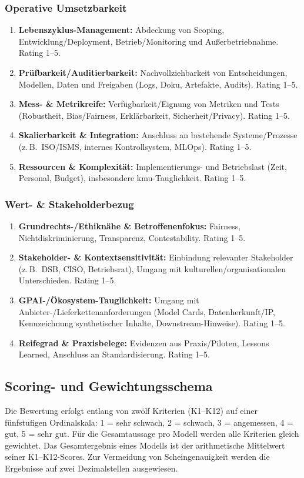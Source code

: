 \subsubsection{Operative Umsetzbarkeit}
\begin{enumerate}
  \item[K4] \textbf{Lebenszyklus-Management:} Abdeckung von Scoping, Entwicklung/Deployment, Betrieb/Monitoring und Außerbetriebnahme. Rating 1–5.
  \item[K5] \textbf{Prüfbarkeit/Auditierbarkeit:} Nachvollziehbarkeit von Entscheidungen, Modellen, Daten und Freigaben (Logs, Doku, Artefakte, Audits). Rating 1–5.
  \item[K6] \textbf{Mess- \& Metrikreife:} Verfügbarkeit/Eignung von Metriken und Tests (Robustheit, Bias/Fairness, Erklärbarkeit, Sicherheit/Privacy). Rating 1–5.
  \item[K7] \textbf{Skalierbarkeit \& Integration:} Anschluss an bestehende Systeme/Prozesse (z.\,B.\ ISO/ISMS, internes Kontrollsystem, MLOps). Rating 1–5.
  \item[K8] \textbf{Ressourcen \& Komplexität:} Implementierungs- und Betriebslast (Zeit, Personal, Budget), insbesondere \ac{kmu}-Tauglichkeit. Rating 1–5.
\end{enumerate}

\subsubsection{Wert- \& Stakeholderbezug}
\begin{enumerate}
  \item[K9] \textbf{Grundrechts-/Ethiknähe \& Betroffenenfokus:} Fairness, Nichtdiskriminierung, Transparenz, Contestability. Rating 1–5.
  \item[K10] \textbf{Stakeholder- \& Kontextsensitivität:} Einbindung relevanter Stakeholder (z.\,B.\ DSB, CISO, Betriebsrat), Umgang mit kulturellen/organisationalen Unterschieden. Rating 1–5.
  \item[K11] \textbf{GPAI-/Ökosystem-Tauglichkeit:} Umgang mit Anbieter-/Lieferkettenanforderungen (Model Cards, Datenherkunft/IP, Kennzeichnung synthetischer Inhalte, Downstream-Hinweise). Rating 1–5.
  \item[K12] \textbf{Reifegrad \& Praxisbelege:} Evidenzen aus Praxis/Piloten, Lessons Learned, Anschluss an Standardisierung. Rating 1–5.
\end{enumerate}

\subsection{Scoring- und Gewichtungsschema}
\label{subsec:scoringgewichtung}
Die Bewertung erfolgt entlang von zwölf Kriterien (K1–K12) auf einer fünfstufigen Ordinalskala: 1 = sehr schwach, 2 = schwach, 3 = angemessen, 4 = gut, 5 = sehr gut.
Für die Gesamtaussage pro Modell werden alle Kriterien gleich gewichtet.
Das Gesamtergebnis eines Modells ist der arithmetische Mittelwert seiner K1–K12-Scores.
Zur Vermeidung von Scheingenauigkeit werden die Ergebnisse auf zwei Dezimalstellen ausgewiesen.

